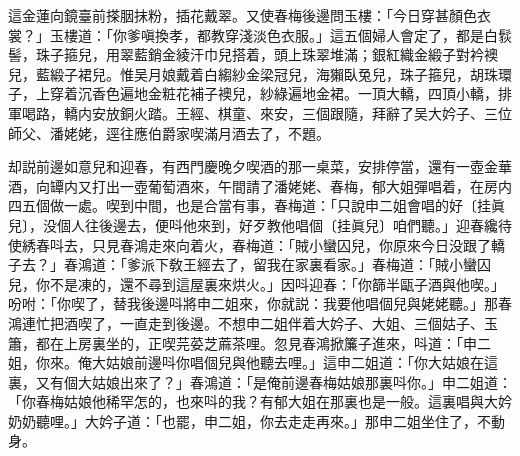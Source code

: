 這金蓮向鏡臺前搽胭抹粉，插花戴翠。又使春梅後邊問玉樓：「今日穿甚顏色衣裳？」玉樓道：「你爹嗔換孝，都教穿淺淡色衣服。」這五個婦人會定了，都是白䯼髻，珠子箍兒，用翠藍銷金綾汗巾兒搭着，頭上珠翠堆滿；銀紅織金緞子對衿襖兒，藍緞子裙兒。惟吴月娘戴着白縐紗金梁冠兒，海獺臥兔兒，珠子箍兒，胡珠環子，上穿着沉香色遍地金粧花補子襖兒，紗綠遍地金裙。一頂大轎，四頂小轎，排軍喝路，轎内安放銅火踏。王經、棋童、來安，三個跟隨，拜辭了吴大妗子、三位師父、潘姥姥，逕往應伯爵家喫滿月酒去了，不題。

却説前邊如意兒和迎春，有西門慶晚夕喫酒的那一桌菜，安排停當，還有一壺金華酒，向罈内又打出一壺葡萄酒來，午間請了潘姥姥、春梅，郁大姐彈唱着，在房内四五個做一處。喫到中間，也是合當有事，春梅道：「只說申二姐會唱的好〔挂眞兒〕，没個人往後邊去，便呌他來到，好歹教他唱個〔挂眞兒〕咱們聽。」迎春纔待使綉春呌去，只見春鴻走來向着火，春梅道：「賊小蠻囚兒，你原來今日没跟了轎子去？」春鴻道：「爹派下敎王經去了，留我在家裏看家。」春梅道：「賊小蠻囚兒，你不是凍的，還不尋到這屋裏來烘火。」因呌迎春：「你篩半甌子酒與他喫。」吩咐：「你喫了，替我後邊呌將申二姐來，你就説：我要他唱個兒與姥姥聽。」那春鴻連忙把酒喫了，一直走到後邊。不想申二姐伴着大妗子、大姐、三個姑子、玉簫，都在上房裏坐的，正喫芫荽芝蔴茶哩。忽見春鴻掀簾子進來，呌道：「申二姐，你來。俺大姑娘前邊呌你唱個兒與他聽去哩。」這申二姐道：「你大姑娘在這裏，又有個大姑娘出來了？」春鴻道：「是俺前邊春梅姑娘那裏呌你。」申二姐道：「你春梅姑娘他稀罕怎的，也來呌的我？有郁大姐在那裏也是一般。這裏唱與大妗奶奶聽哩。」大妗子道：「也罷，申二姐，你去走走再來。」那申二姐坐住了，不動身。

